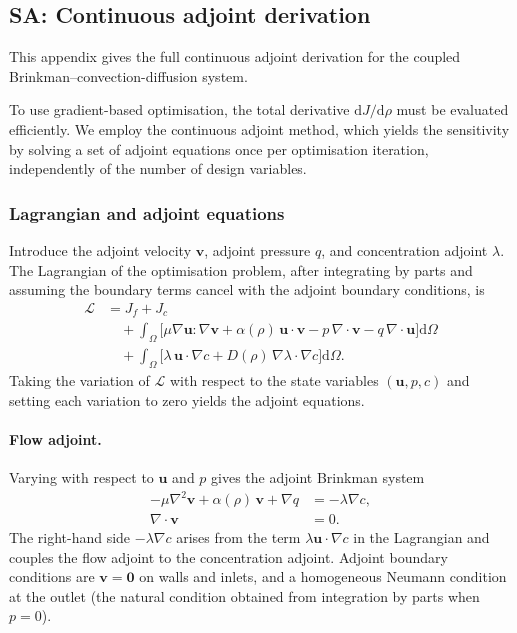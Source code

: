 \subsection*{SA: Continuous adjoint derivation}
\label{sec:supp_adjoint}

This appendix gives the full continuous adjoint derivation
for the coupled Brinkman--convection-diffusion system.


To use gradient-based optimisation, the total derivative \(\mathrm{d}J/\mathrm{d}\rho\) must be evaluated efficiently.
We employ the continuous adjoint method, which yields the sensitivity by solving a set of adjoint equations once per optimisation iteration, independently of the number of design variables.

\subsubsection{Lagrangian and adjoint equations}
Introduce the adjoint velocity \(\mathbf{v}\), adjoint pressure \(q\), and concentration adjoint \(\lambda\).
The Lagrangian of the optimisation problem, after integrating by parts and assuming the boundary terms cancel with the adjoint boundary conditions, is
\begin{equation}
    \begin{aligned}
        \mathcal{L} &= J_f + J_c \\
        &\quad + \int_\Omega \bigl[ \mu\nabla\mathbf{u}:\nabla\mathbf{v} + \alpha(\rho)\,\mathbf{u}\cdot\mathbf{v} - p\,\nabla\cdot\mathbf{v} - q\,\nabla\cdot\mathbf{u} \bigr] \mathrm{d}\Omega \\
        &\quad + \int_\Omega \bigl[ \lambda\,\mathbf{u}\cdot\nabla c + D(\rho)\,\nabla\lambda\cdot\nabla c \bigr] \mathrm{d}\Omega .
    \end{aligned}
    \label{eq:lagrangian}
\end{equation}
Taking the variation of \(\mathcal{L}\) with respect to the state variables \((\mathbf{u},p,c)\) and setting each variation to zero yields the adjoint equations.

\paragraph{Flow adjoint.}
Varying with respect to \(\mathbf{u}\) and \(p\) gives the adjoint Brinkman system
\begin{subequations}
\begin{align}
    -\mu\nabla^2\mathbf{v} + \alpha(\rho)\,\mathbf{v} + \nabla q &= -\lambda\nabla c, \label{eq:adj_flow_mom}\\
    \nabla\cdot\mathbf{v} &= 0. \label{eq:adj_flow_div}
\end{align}
\end{subequations}
The right-hand side \(-\lambda\nabla c\) arises from the term \(\lambda\mathbf{u}\cdot\nabla c\) in the Lagrangian and couples the flow adjoint to the concentration adjoint.
Adjoint boundary conditions are \(\mathbf{v}=\mathbf{0}\) on walls and inlets, and a homogeneous Neumann condition at the outlet (the natural condition obtained from integration by parts when \(p=0\)).

